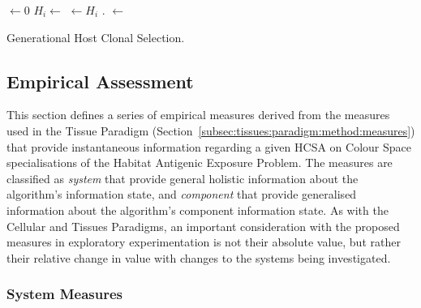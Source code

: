 \begin{algorithm}[htp]
  \SetLine
  \SetLine
  
	\KwOut{\Pop} 	
	
	\Pop $\leftarrow$0\;
	{
		$H_i \leftarrow$ \CreateHost{}\;
		\Pop $\leftarrow H_i$\;
	}
	\While{$\neg$\StopCondition{}}
	{		
		\While{$\neg$\GenerationalChange{}}
		{
			\Env.\Exposure{\Pop}\;
			\HostInteractions{\Pop}\;
		}
		\If{$\neg$\StopCondition{}}
		{
			\Pop $\leftarrow$ \CreatePopulation{\Pop}\;
		}
	}
	\Return{\Pop}\;
	\caption{Generational Host Clonal Selection.}
	\label{alg:hosts:algorithms:ghcsa}
\end{algorithm}


%
%
\subsection{Empirical Assessment}
\label{subsec:hosts:paradigm:realised:measures}
This section defines a series of empirical measures derived from the measures used in the Tissue Paradigm (Section~\ref{subsec:tissues:paradigm:method:measures}) that provide instantaneous information regarding a given HCSA on Colour Space specialisations of the Habitat Antigenic Exposure Problem. The measures are classified as \emph{system} that provide general holistic information about the algorithm's information state, and \emph{component} that provide generalised information about the algorithm's component information state. As with the Cellular and Tissues Paradigms, an important consideration with the proposed measures in exploratory experimentation is not their absolute value, but rather their relative change in value with changes to the systems being investigated.


%
%
\subsubsection{System Measures}

%
%
